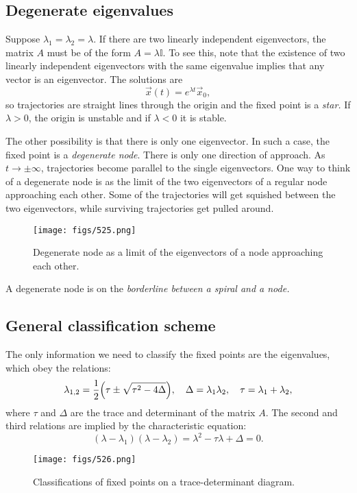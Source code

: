 \documentclass[oneside]{book}
\begin{document}
\subsection{Degenerate eigenvalues}
Suppose $ \lambda_1 = \lambda_2 = \lambda $. If there are two linearly independent eigenvectors, the matrix $ A $ must be of the form $ A = \lambda \mathbb{I} $. To see this, note that the existence of two linearly independent eigenvectors with the same eigenvalue implies that any vector is an eigenvector. The solutions are
\[
\vec{x}(t) = e^{\lambda t} \vec{x}_0,
\]
so trajectories are straight lines through the origin and the fixed point is a \textit{star.} If $ \lambda > 0 $, the origin is unstable and if $ \lambda < 0 $ it is stable.
\par
The other possibility is that there is only one eigenvector. In such a case, the fixed point is a \textit{degenerate node}. There is only one direction of approach. As $ t \to \pm \infty $, trajectories become parallel to the single eigenvectors. One way to think of a degenerate node is as the limit of the two eigenvectors of a regular node approaching each other. Some of the trajectories will get squished between the two eigenvectors, while surviving trajectories get pulled around.
\begin{figure}[h]
	\centering
	\texttt{[image: figs/525.png]}
	\caption{Degenerate node as a limit of the eigenvectors of a node approaching each other.}
\end{figure}
\par
A degenerate node is on the \textit{borderline between a spiral and a node.} 
\subsection{General classification scheme}
The only information we need to classify the fixed points are the eigenvalues, which obey the relations:
\begin{equation}
	\lambda_{1,2} = \frac{1}{2} \qty( \tau \pm \sqrt{\tau^2 - 4 \Delta} ), \quad \Delta = \lambda_1 \lambda_2, \quad \tau = \lambda_1 + \lambda_2,
\end{equation}
where $ \tau $ and $ \Delta $ are the trace and determinant of the matrix $ A $. The second and third relations are implied by the characteristic equation:
\[
(\lambda - \lambda_1)(\lambda - \lambda_2) = \lambda^2 - \tau \lambda + \Delta = 0.
\]
\begin{figure}[h]
	\centering
	\texttt{[image: figs/526.png]}
	\caption{Classifications of fixed points on a trace-determinant diagram.}
\end{figure}
\end{document}
